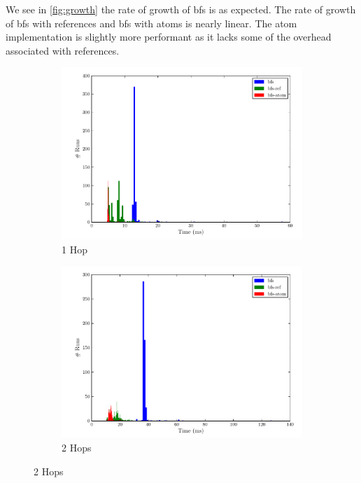 				We see in \cref{fig:growth} the rate of growth of \gls{bfs} is as expected.  The rate of growth of \gls{bfs} with references and \gls{bfs} with atoms is nearly linear.  The atom implementation is slightly more performant as it lacks some of the overhead associated with references.
				
				\begin{figure}
					\begin{subfigure}[b]{.5\linewidth}
						\includegraphics[scale=0.45]{figures/charts/1_hops.pdf}
						\caption{1 Hop}
						\label{subfig:1-hop}
					\end{subfigure}
					\begin{subfigure}[b]{.5\linewidth}
						\includegraphics[scale=0.45]{figures/charts/2_hops.pdf}
						\caption{2 Hops}
						\label{subfig:2-hops}
					\end{subfigure}
				\end{figure}
